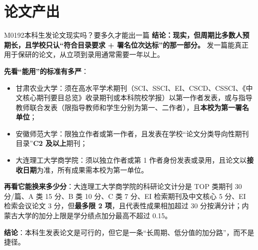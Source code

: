 \section{论文产出}
\begin{qa}{M0192}{本科生发论文现实吗？要多久才能出一篇}
\textbf{结论：现实，但周期比多数人预期长，且学校只认“符合目录要求 + 署名位次达标”的那一部分。} 发一篇能真正用于保研的论文，从立项到录用通常需要一年以上。

\textbf{先看“能用”的标准有多严}：
\begin{itemize}
  \item 甘肃农业大学：须在高水平学术期刊（SCI、SSCI、EI、CSCD、CSSCI、《中文核心期刊要目总览》收录期刊或本科院校学报）以第一作者发表，或与指导教师联合发表（限指导教师和学生分别为第一、二作者），且\textbf{本校为第一署名单位}；
  \item 安徽师范大学：限独立作者或第一作者，且发表在学校“论文分类导向性期刊目录”\textbf{C2 及以上}期刊；
  \item 大连理工大学商学院：须以独立作者或第 1 作者身份发表或录用，且论文以\textbf{接收日期}为准，所有成果需本校为第一单位。
\end{itemize}

\textbf{再看它能换来多少分}：大连理工大学商学院的科研论文计分是 TOP 类期刊 30 分/篇、A 类 15 分、B 类 10 分、C 类 7 分、EI 检索期刊及中文核心 5 分、EI 检索会议论文 3 分，但\textbf{最多限 2 项}，且代表性成果相加超过 30 分按满分计；内蒙古大学的加分上限是学分绩点加分最高不超过 0.15。

\textbf{结论}：本科生发表论文是可行的，但它是一条“长周期、低分值的加分路”，而不是捷径。
\end{qa}

